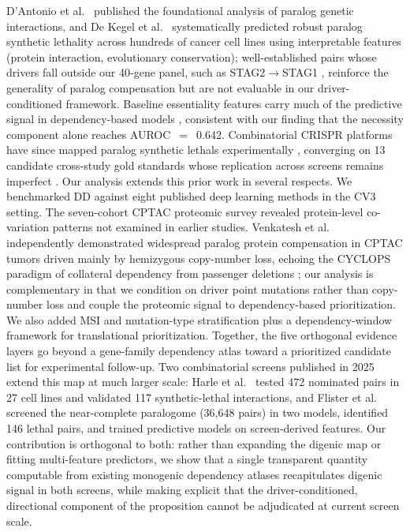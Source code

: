 \documentclass[11pt,a4paper]{article}
\begin{document}
D'Antonio et al.\ \cite{DAntonio2013} published the foundational analysis of paralog genetic interactions, and De Kegel et al.\ \cite{DeKegel2021} systematically predicted robust paralog synthetic lethality across hundreds of cancer cell lines using interpretable features (protein interaction, evolutionary conservation); well-established pairs whose drivers fall outside our 40-gene panel, such as STAG2$\rightarrow$STAG1 \cite{vanderLelij2017}, reinforce the generality of paralog compensation but are not evaluable in our driver-conditioned framework. Baseline essentiality features carry much of the predictive signal in dependency-based models \cite{Tsherniak2017,Behan2019}, consistent with our finding that the necessity component alone reaches AUROC~$=$~0.642. Combinatorial CRISPR platforms have since mapped paralog synthetic lethals experimentally \cite{Parrish2021,Thompson2021,Dede2020,Gonatopoulos2020,Ito2021,EsmaeiliAnvar2024}, converging on 13 candidate cross-study gold standards \cite{EsmaeiliAnvar2024} whose replication across screens remains imperfect \cite{Chou2025}. Our analysis extends this prior work in several respects. We benchmarked DD against eight published deep learning methods in the CV3 setting. The seven-cohort CPTAC proteomic survey revealed protein-level co-variation patterns not examined in earlier studies. Venkatesh et al.\ \cite{Venkatesh2025} independently demonstrated widespread paralog protein compensation in CPTAC tumors driven mainly by hemizygous copy-number loss, echoing the CYCLOPS paradigm of collateral dependency from passenger deletions \cite{Nijhawan2012,Muller2012}; our analysis is complementary in that we condition on driver point mutations rather than copy-number loss and couple the proteomic signal to dependency-based prioritization. We also added MSI and mutation-type stratification plus a dependency-window framework for translational prioritization. Together, the five orthogonal evidence layers go beyond a gene-family dependency atlas toward a prioritized candidate list for experimental follow-up. Two combinatorial screens published in 2025 extend this map at much larger scale: Harle et al.\ \cite{Harle2025} tested 472 nominated pairs in 27 cell lines and validated 117 synthetic-lethal interactions, and Flister et al.\ \cite{Flister2025} screened the near-complete paralogome (36{,}648 pairs) in two models, identified 146 lethal pairs, and trained predictive models on screen-derived features. Our contribution is orthogonal to both: rather than expanding the digenic map or fitting multi-feature predictors, we show that a single transparent quantity computable from existing monogenic dependency atlases recapitulates digenic signal in both screens, while making explicit that the driver-conditioned, directional component of the proposition cannot be adjudicated at current screen scale.
\end{document}
